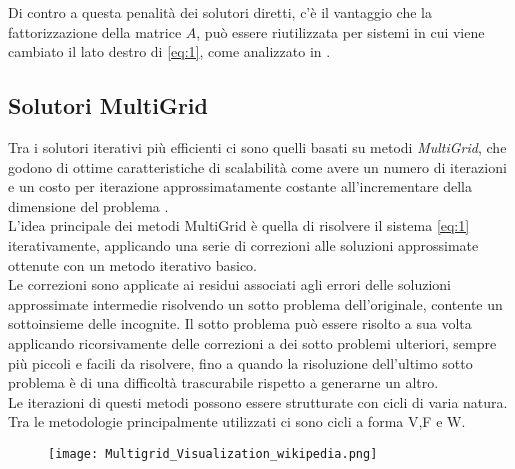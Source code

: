Di contro a questa penalità dei solutori diretti, c'è il vantaggio che la fattorizzazione della matrice $A$, 
può essere riutilizzata per sistemi in cui viene cambiato il lato destro di \ref{eq:1},
come analizzato in \cite{sparseLinearSolverTR}.\\
\voidLine
\subsection{Solutori MultiGrid} \label{multiGrid}
Tra i solutori iterativi più efficienti ci sono quelli basati su metodi \emph{MultiGrid}, 
che godono di ottime caratteristiche di scalabilità come avere un numero di iterazioni e 
un costo per iterazione approssimatamente costante all'incrementare della dimensione del problema \cite{AMGgeneralANY,Sp3MM4AMG}.\\
L'idea principale dei metodi MultiGrid è quella di 
risolvere il sistema \ref{eq:1} iterativamente, applicando una serie di correzioni 
alle soluzioni approssimate ottenute con un metodo iterativo basico.\\
Le correzioni sono applicate ai residui associati agli errori delle soluzioni approssimate intermedie
risolvendo un sotto problema dell'originale, contente un sottoinsieme delle incognite. %
Il sotto problema può essere risolto a sua volta applicando ricorsivamente delle correzioni
a dei sotto problemi ulteriori, sempre più piccoli e facili da risolvere,
fino a quando la risoluzione dell'ultimo sotto problema è di una difficoltà trascurabile 
rispetto a generarne un altro.\\
Le iterazioni di questi metodi possono essere strutturate con cicli di varia natura.
Tra le metodologie principalmente utilizzati ci sono cicli a forma V,F e W.\\
\begin{figure}[h!]
  \centering \texttt{[image: Multigrid\_Visualization\_wikipedia.png]}
  \caption[Rappresentazione grafica di un ciclo V di un solutore MultiGrid]
  \decoRule \label{fig:Multigrid_Visualization_wikipedia}
\end{figure}

